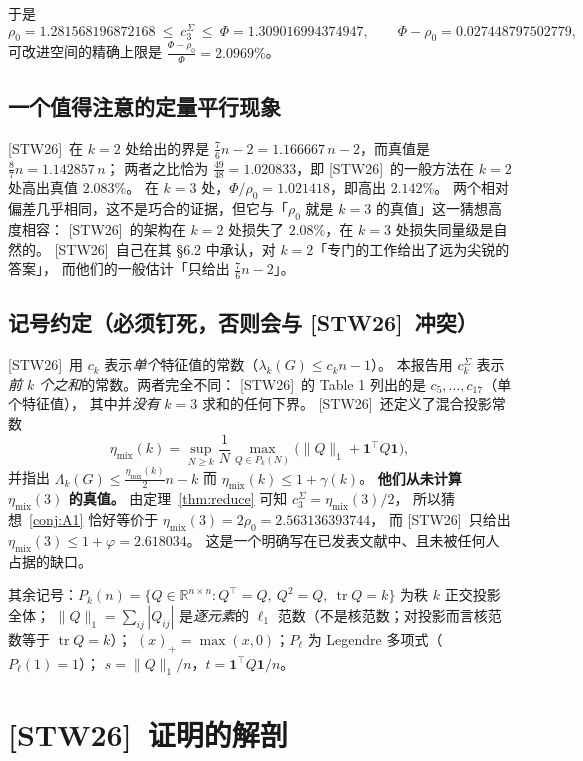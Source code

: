 \documentclass[UTF8,11pt]{ctexart}
\theoremstyle{definition}
\newcommand{\Lam}{\Lambda}
\newcommand{\tr}{\operatorname{tr}}
\newcommand{\R}{\mathbb{R}}
\newcommand{\one}{\mathbf{1}}
\newcommand{\STW}{\textup{[STW26]}}
\begin{document}
于是
\[
\rho_0=1.281568196872168\ \le\ c_3^{\Sigma}\ \le\ \Phi=1.309016994374947,
\qquad \Phi-\rho_0=0.027448797502779 ,
\]
可改进空间的精确上限是 $\frac{\Phi-\rho_0}{\Phi}=2.0969\%$。

\subsection{一个值得注意的定量平行现象}

\STW\ 在 $k=2$ 处给出的界是 $\frac76 n-2=1.166667\,n-2$，而真值是 $\frac87 n=1.142857\,n$；
两者之比恰为 $\frac{49}{48}=1.020833$，即 \STW\ 的一般方法在 $k=2$ 处高出真值 $2.083\%$。
在 $k=3$ 处，$\Phi/\rho_0=1.021418$，即高出 $2.142\%$。
两个相对偏差几乎相同，这不是巧合的证据，但它与「$\rho_0$ 就是 $k=3$ 的真值」这一猜想高度相容：
\STW\ 的架构在 $k=2$ 处损失了 $2.08\%$，在 $k=3$ 处损失同量级是自然的。
\STW\ 自己在其 \S6.2 中承认，对 $k=2$「专门的工作给出了远为尖锐的答案」，
而他们的一般估计「只给出 $\frac76n-2$」。

\subsection{记号约定（必须钉死，否则会与 \STW\ 冲突）}

\STW\ 用 $c_k$ 表示\emph{单个}特征值的常数（$\lambda_k(G)\le c_k n-1$）。
本报告用 $c_k^{\Sigma}$ 表示\emph{前 $k$ 个之和}的常数。两者完全不同：
\STW\ 的 Table 1 列出的是 $c_5,\dots,c_{17}$（单个特征值），
其中并\emph{没有} $k=3$ 求和的任何下界。
\STW\ 还定义了混合投影常数
\[
\eta_{\mathrm{mix}}(k)=\sup_{N\ge k}\frac1N\max_{Q\in P_k(N)}\bigl(\|Q\|_1+\one^\top Q\one\bigr),
\]
并指出 $\Lam_k(G)\le\frac{\eta_{\mathrm{mix}}(k)}2n-k$ 而 $\eta_{\mathrm{mix}}(k)\le 1+\gamma(k)$。
\textbf{他们从未计算 $\eta_{\mathrm{mix}}(3)$ 的真值。}
由定理~\ref{thm:reduce} 可知 $c_3^{\Sigma}=\eta_{\mathrm{mix}}(3)/2$，
所以猜想~\ref{conj:A1} 恰好等价于 $\eta_{\mathrm{mix}}(3)=2\rho_0=2.563136393744$，
而 \STW\ 只给出 $\eta_{\mathrm{mix}}(3)\le 1+\varphi=2.618034$。
这是一个明确写在已发表文献中、且未被任何人占据的缺口。

其余记号：$P_k(n)=\{Q\in\R^{n\times n}:Q^\top=Q,\ Q^2=Q,\ \tr Q=k\}$ 为秩 $k$ 正交投影全体；
$\|Q\|_1=\sum_{ij}|Q_{ij}|$ 是\emph{逐元素}的 $\ell_1$ 范数（不是核范数；对投影而言核范数等于 $\tr Q=k$）；
$(x)_+=\max(x,0)$；$P_\ell$ 为 Legendre 多项式（$P_\ell(1)=1$）；
$s=\|Q\|_1/n$，$t=\one^\top Q\one/n$。

\section{\STW\ 证明的解剖}\label{sec:stwanat}
\end{document}
